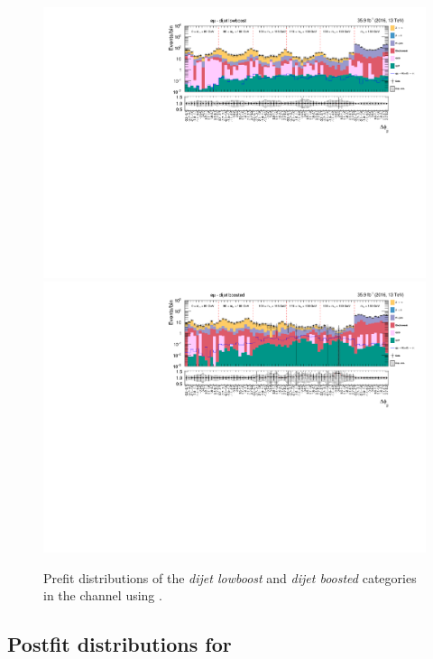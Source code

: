 \begin{figure}[h!]
    \centering       
        \includegraphics[width=\textwidth]{Figures/statana/Postfit_JEC_jdphi/prefit_htt_em_3_13TeV.pdf}\\
        \includegraphics[width=\textwidth]{Figures/statana/Postfit_JEC_jdphi/prefit_htt_em_4_13TeV.pdf}
    \caption{Prefit distributions of the \textit{dijet lowboost} and \textit{dijet boosted} categories in the \emu{} channel  using \jdphi{}.}
\end{figure}
\clearpage

\subsection{Postfit distributions for \jdphi}

